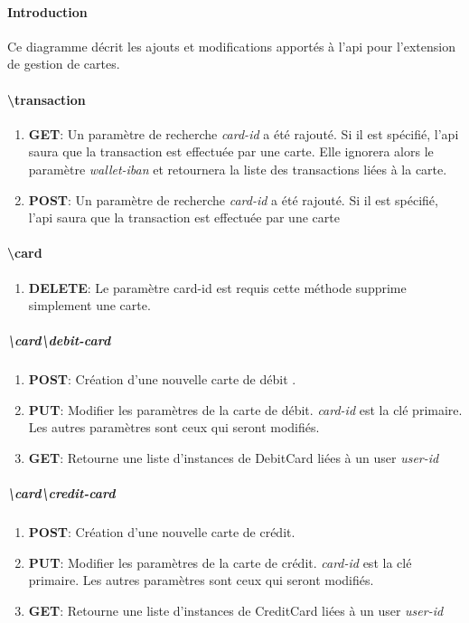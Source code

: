 \documentclass{article}
\begin{document}
\paragraph{Introduction}

Ce diagramme décrit les ajouts et modifications apportés à l'api pour l'extension de
gestion de cartes.

\paragraph{\textbackslash transaction}
   
    \begin{enumerate}
        \item \textbf{GET}: Un paramètre de recherche \emph{card-id} a été rajouté. Si il est spécifié, l'api saura que la
                            transaction est effectuée par une carte. Elle ignorera alors le paramètre \emph{wallet-iban} et 
                            retournera la liste des transactions liées à la carte.
        \item \textbf{POST}: Un paramètre de recherche \emph{card-id} a été rajouté. Si il est spécifié, l'api saura que la
                            transaction est effectuée par une carte
    \end{enumerate}

\paragraph{\textbackslash card}

    \begin{enumerate}
        \item \textbf{DELETE}: Le paramètre card-id est requis cette méthode supprime simplement une carte.
    \end{enumerate}

    \subparagraph{\textbackslash card\textbackslash debit-card}
        \begin{enumerate}
            \item \textbf{POST}: Création d'une nouvelle carte de débit .
            \item \textbf{PUT}: Modifier les paramètres de la carte de débit. \emph{card-id} est la clé primaire. Les autres paramètres
                                sont ceux qui seront modifiés.
            \item \textbf{GET}: Retourne une liste d'instances de DebitCard liées à un user \emph{user-id}
        \end{enumerate}
    
    \subparagraph{\textbackslash card\textbackslash credit-card}
        \begin{enumerate}
            \item \textbf{POST}: Création d'une nouvelle carte de crédit.
            \item \textbf{PUT}: Modifier les paramètres de la carte de crédit. \emph{card-id} est la clé primaire. Les autres paramètres
                                sont ceux qui seront modifiés.
            \item \textbf{GET}: Retourne une liste d'instances de CreditCard liées à un user \emph{user-id}
        \end{enumerate}
\end{document}
